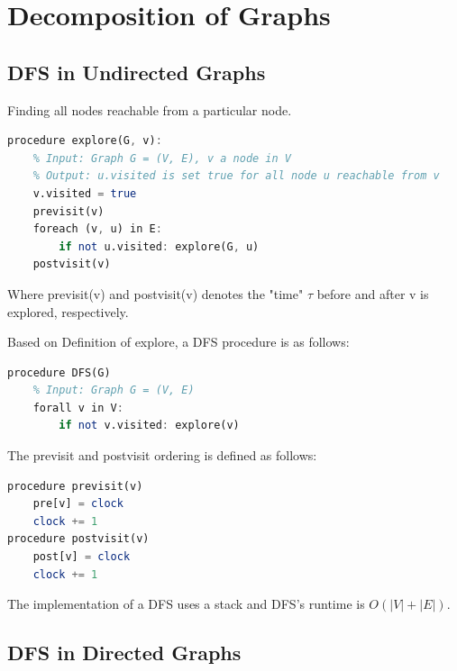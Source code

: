 \section{Decomposition of Graphs}

\subsection{DFS in Undirected Graphs}

\begin{definition}[explore]
Finding all nodes reachable from a particular node.
	\begin{lstlisting}[mathescape=true, language=Octave]
procedure explore(G, v):
	% Input: Graph G = (V, E), v a node in V
	% Output: u.visited is set true for all node u reachable from v
	v.visited = true
	previsit(v)
	foreach (v, u) in E:
		if not u.visited: explore(G, u)
	postvisit(v)
\end{lstlisting}
Where previsit(v) and postvisit(v) denotes the "time" $\tau$ before and after v is explored, respectively.
\end{definition}

\begin{definition}[DFS]
Based on Definition of explore, a DFS procedure is as follows:
\begin{lstlisting}[mathescape=true, language=Octave]
procedure DFS(G)
	% Input: Graph G = (V, E)
	forall v in V:
		if not v.visited: explore(v)
\end{lstlisting}
\end{definition}

\begin{definition}[ordering]
The previsit and postvisit ordering is defined as follows:
\begin{lstlisting}[mathescape=true, language=Octave]
procedure previsit(v)
	pre[v] = clock
	clock += 1
procedure postvisit(v)
	post[v] = clock
	clock += 1
\end{lstlisting}
\end{definition}

\begin{remark}
The implementation of a DFS uses a stack and DFS's runtime is $O(|V|+|E|)$.
\end{remark}

\subsection{DFS in Directed Graphs}

